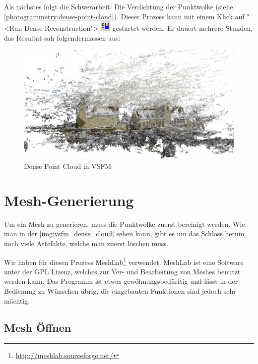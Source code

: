 Als nächstes folgt die Schwerarbeit: Die Verdichtung der Punktwolke (siehe
\autoref{photogrammetry:dense-point-cloud}). Dieser Prozess kann mit einem Klick
auf "<Run Dense Reconstruction">
\includegraphics[scale=0.75]{images/vsfm_icon_dense} gestartet werden. Er dauert
mehrere Stunden, das Resultat sah folgendermassen aus:

\begin{figure}[H]
	\centering
	\includegraphics[width=\textwidth]{images/dense-matrix.jpg}
	\caption{Dense Point Cloud in VSFM}
	\label{img:vsfm_dense_cloud}
\end{figure}



\section{Mesh-Generierung}

\label{workflow:mesh-generating}

Um ein Mesh zu generieren, muss die Punktwolke zuerst bereinigt werden. Wie man
in der \autoref{img:vsfm_dense_cloud} sehen kann, gibt es um das Schloss herum
noch viele Artefakte, welche man zuerst löschen muss.

Wir haben für diesen Prozess
MeshLab\footnote{\url{http://meshlab.sourceforge.net/}} verwendet. MeshLab ist
eine Software unter der GPL Lizenz, welches zur Ver- und Bearbeitung von Meshes
benutzt werden kann. Das Programm ist etwas gewöhnungsbedürftig und lässt in der
Bedienung zu Wünschen übrig, die eingebauten Funktionen sind jedoch sehr
mächtig.

\subsection{Mesh Öffnen}

